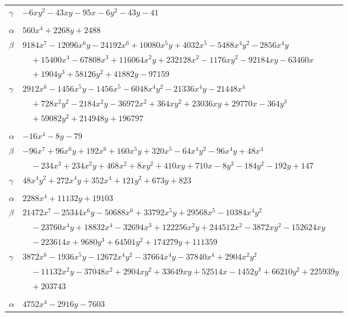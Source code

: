 \documentclass[11pt]{article}
\begin{document}
\begin{longtable}{@{}ll@{}}
$\gamma$ & $-6xy^{2}-43xy-95x-6y^{2}-43y-41$\\
\addlinespace[3pt]
\multicolumn{2}{@{}l}{$\{i,j\}=\{7,54\}$, $k_{ij}=3^{2}$}\\
$\alpha$ & $560x^{4}+2268y+2488$\\
$\beta$ & $9184x^{7}-12096x^{6}y-24192x^{6}+10080x^{5}y+4032x^{5}-5488x^{4}y^{2}-2856x^{4}y$\\
 & $\quad +15400x^{4}-67808x^{3}+116064x^{2}y+232128x^{2}-1176xy^{2}-92184xy-63460x$\\
 & $\quad +1904y^{3}+58126y^{2}+41882y-97159$\\
$\gamma$ & $2912x^{6}-1456x^{5}y-1456x^{5}-6048x^{4}y^{2}-21336x^{4}y-21448x^{4}$\\
 & $\quad +728x^{2}y^{2}-2184x^{2}y-36972x^{2}+364xy^{2}+23036xy+29770x-364y^{3}$\\
 & $\quad +59082y^{2}+214948y+196797$\\
\addlinespace[3pt]
\multicolumn{2}{@{}l}{$\{i,j\}=\{7,59\}$, $k_{ij}=2\cdot 3^{2}\cdot 5^{2}$}\\
$\alpha$ & $-16x^{4}-8y-79$\\
$\beta$ & $-96x^{7}+96x^{6}y+192x^{6}+160x^{5}y+320x^{5}-64x^{4}y^{2}-96x^{4}y+48x^{4}$\\
 & $\quad -234x^{3}+234x^{2}y+468x^{2}+8xy^{2}+410xy+710x-8y^{3}-184y^{2}-192y+147$\\
$\gamma$ & $48x^{4}y^{2}+272x^{4}y+352x^{4}+121y^{2}+673y+823$\\
\addlinespace[3pt]
\multicolumn{2}{@{}l}{$\{i,j\}=\{7,71\}$, $k_{ij}=2^{7}$}\\
$\alpha$ & $2288x^{4}+11132y+19103$\\
$\beta$ & $21472x^{7}-25344x^{6}y-50688x^{6}+33792x^{5}y+29568x^{5}-10384x^{4}y^{2}$\\
 & $\quad -23760x^{4}y+18832x^{4}-32694x^{3}+122256x^{2}y+244512x^{2}-3872xy^{2}-152624xy$\\
 & $\quad -223614x+9680y^{3}+64501y^{2}+174279y+111359$\\
$\gamma$ & $3872x^{6}-1936x^{5}y-12672x^{4}y^{2}-37664x^{4}y-37840x^{4}+2904x^{2}y^{2}$\\
 & $\quad -11132x^{2}y-37048x^{2}+2904xy^{2}+33649xy+52514x-1452y^{3}+66210y^{2}+225939y$\\
 & $\quad +203743$\\
\addlinespace[3pt]
\multicolumn{2}{@{}l}{$\{i,j\}=\{7,75\}$, $k_{ij}=2^{2}\cdot 5\cdot 13$}\\
$\alpha$ & $4752x^{4}-2916y-7603$\\

\end{longtable}
\end{document}
